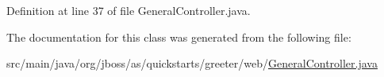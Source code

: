 Definition at line 37 of file General\+Controller.\+java.



The documentation for this class was generated from the following file\+:\begin{DoxyCompactItemize}
\item 
src/main/java/org/jboss/as/quickstarts/greeter/web/\hyperlink{_general_controller_8java}{General\+Controller.\+java}\end{DoxyCompactItemize}
